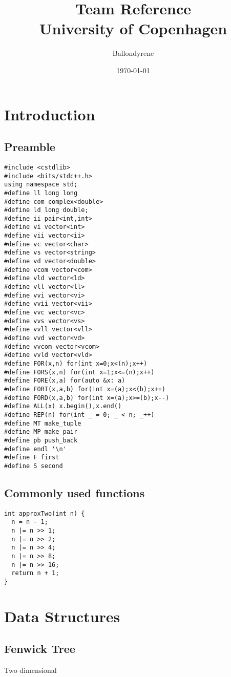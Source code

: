 \documentclass[a4paper,11pt]{article}
\title{Team Reference\\
       University of Copenhagen}
\author{Ballondyrene}
\date{\today}
\begin{document}
\maketitle
\thispagestyle{fancy}
\tableofcontents

\section{Introduction}
  \subsection{Preamble}
\begin{lstlisting}
#include <cstdlib>
#include <bits/stdc++.h>
using namespace std;
#define ll long long
#define com complex<double>
#define ld long double;
#define ii pair<int,int>
#define vi vector<int>
#define vii vector<ii>
#define vc vector<char>
#define vs vector<string>
#define vd vector<double>
#define vcom vector<com>
#define vld vector<ld>
#define vll vector<ll>
#define vvi vector<vi>
#define vvii vector<vii>
#define vvc vector<vc>
#define vvs vector<vs>
#define vvll vector<vll>
#define vvd vector<vd>
#define vvcom vector<vcom>
#define vvld vector<vld>
#define FOR(x,n) for(int x=0;x<(n);x++)
#define FORS(x,n) for(int x=1;x<=(n);x++)
#define FORE(x,a) for(auto &x: a)
#define FORT(x,a,b) for(int x=(a);x<(b);x++)
#define FORD(x,a,b) for(int x=(a);x>=(b);x--)
#define ALL(x) x.begin(),x.end()
#define REP(n) for(int _ = 0; _ < n; _++)
#define MT make_tuple
#define MP make_pair
#define pb push_back
#define endl '\n'
#define F first
#define S second

\end{lstlisting}
  
  \subsection{Commonly used functions}
\begin{lstlisting}
int approxTwo(int n) {
  n = n - 1;
  n |= n >> 1;
  n |= n >> 2;
  n |= n >> 4;
  n |= n >> 8;
  n |= n >> 16;
  return n + 1;
}
\end{lstlisting}

\section{Data Structures}
  \subsection{Fenwick Tree}
    
    Two dimensional
    
  
\end{document}
